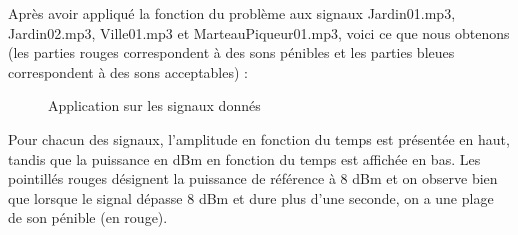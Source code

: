 Après avoir appliqué la fonction du problème aux signaux Jardin01.mp3, Jardin02.mp3, Ville01.mp3 et MarteauPiqueur01.mp3, voici ce que nous obtenons (les parties rouges correspondent à des sons pénibles et les parties bleues correspondent à des sons acceptables) :

\begin{figure}[htb]
\caption{Application sur les signaux donnés}
\label{Fig.main.2}
\end{figure}


Pour chacun des signaux, l'amplitude en fonction du temps est présentée en haut, tandis que la puissance en dBm en fonction du temps est affichée en bas. Les pointillés rouges désignent la puissance de référence à 8 dBm et on observe bien que lorsque le signal dépasse 8 dBm et dure plus d'une seconde, on a une plage de son pénible (en rouge).